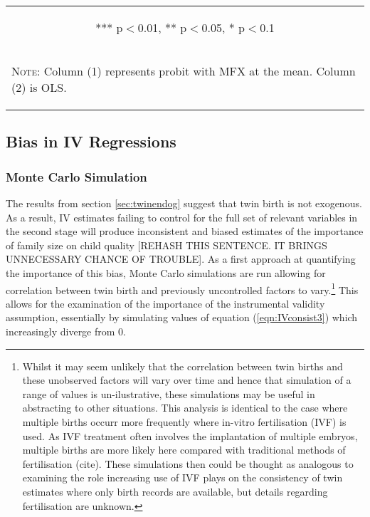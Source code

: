 \documentclass{article}[11pt,subeqn]
\begin{document}
\begin{spacing}{1.25}
\begin{table}[ht]
\begin{center}
\begin{tabular}{lcc}
\multicolumn{3}{c}{\begin{footnotesize}*** p$<$0.01, ** p$<$0.05, * p$<$0.1\end{footnotesize}} \\ 
\multicolumn{3}{p{7.2cm}}{\setstretch{0.9}\begin{footnotesize}\textsc{Note:} Column (1) represents probit with MFX at the mean.  Column
(2) is OLS.\end{footnotesize}}\\
\bottomrule
\end{tabular}
\end{center}
\end{table}
\subsection{Bias in IV Regressions}
\subsubsection{Monte Carlo Simulation}
\label{scn:MCS}
The results from section \ref{sec:twinendog} suggest that twin birth is not exogenous. As a result, IV estimates failing to control for the full set of 
relevant variables in the second stage will produce inconsistent and biased estimates of the importance of family size on child quality [REHASH THIS SENTENCE.  IT BRINGS UNNECESSARY CHANCE OF TROUBLE].  As a first approach at quantifying the importance of this bias, Monte Carlo simulations are run allowing for correlation between twin birth and previously uncontrolled factors
to vary.\footnote{Whilst it may seem unlikely that the correlation between twin births and these unobserved factors will vary over time and hence that
simulation of a range of values is un-ilustrative, these simulations may be useful in abstracting to other situations.  This analysis is identical to the
case where multiple births occurr more frequently where in-vitro fertilisation (IVF) is used.  As IVF treatment often involves the implantation of 
multiple embryos, multiple births are more likely here compared with traditional methods of fertilisation (cite).  These simulations then could be 
thought as analogous to examining the role increasing use of IVF plays on the consistency of twin estimates where only birth records are available, 
but details regarding fertilisation are unknown.}  This allows for the examination of the importance of the instrumental validity assumption, essentially
by simulating values of equation (\ref{eqn:IVconsist3}) which increasingly diverge from 0. 


\end{spacing}
\end{document}
